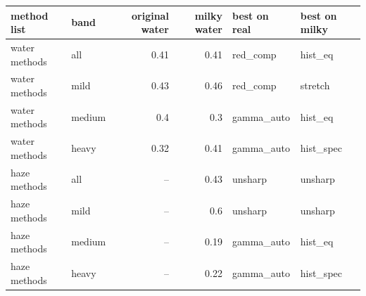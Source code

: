 \begin{tabular}{llrrll}
\toprule
method list & band & original water & milky water & best on real & best on milky \\
\midrule
water methods & all & 0.41 & 0.41 & red\_comp & hist\_eq \\
water methods & mild & 0.43 & 0.46 & red\_comp & stretch \\
water methods & medium & 0.4 & 0.3 & gamma\_auto & hist\_eq \\
water methods & heavy & 0.32 & 0.41 & gamma\_auto & hist\_spec \\
haze methods & all & -- & 0.43 & unsharp & unsharp \\
haze methods & mild & -- & 0.6 & unsharp & unsharp \\
haze methods & medium & -- & 0.19 & gamma\_auto & hist\_eq \\
haze methods & heavy & -- & 0.22 & gamma\_auto & hist\_spec \\
\bottomrule
\end{tabular}
